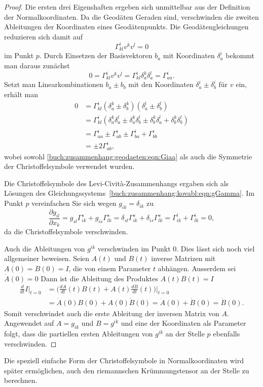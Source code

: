 \begin{proof}
Die ersten drei Eigenshaften ergeben sich unmittelbar aus der Definition
der Normalkoordinaten.
Da die Geodäten Geraden sind, verschwinden die zweiten Ableitungen
der Koordinaten eines Geodätenpunkts.
Die Geodätengleichungen reduzieren sich damit auf
\[
\Gamma^i_{kl} v^kv^l = 0
\]
im Punkt $p$.
Durch Einsetzen der Basisvektoren $b_a$ mit Koordinaten $\delta_a^i$
bekommt man daraus zunächst
\begin{equation}
0
=
\Gamma^i_{kl}v^kv^l
=
\Gamma^i_{kl}\delta_a^k\delta_a^l
=
\Gamma^i_{aa}.
\label{buch:zusammenhang:geodaeten:eqn:Giaa}
\end{equation}
Setzt man Linearkombinationen $b_a\pm b_b$ mit den Koordinaten
$\delta_a^i\pm \delta_b^i$ für $v$ ein, erhält man
\begin{align*}
0
&=
\Gamma^i_{kl} (\delta_a^k \pm \delta_b^k)(\delta_a^l \pm \delta_b^l)
\\
&=
\Gamma^i_{kl}(
    \delta_a^k\delta_a^l
\pm \delta_a^k\delta_b^l
\pm \delta_b^k\delta_a^l
  + \delta_b^k\delta_b^l
)
\\
&=
\Gamma^i_{aa}
\pm
\Gamma^i_{ab}
\pm
\Gamma^i_{ba}
+
\Gamma^i_{bb}
\\
&=
\pm
2
\Gamma^i_{ab},
\end{align*}
wobei sowohl
\eqref{buch:zusammenhang:geodaeten:eqn:Giaa}
als auch die Symmetrie der Christoffelsymbole verwendet wurden.

Die Christoffelsymbole des Levi-Cività-Zusammenhangs ergaben sich
als Lösungen des Gleichungssystems~\ref{buch:zusammenhang:kovabl:eqn:gGamma}.
Im Punkt $p$ vereinfachen Sie sich wegen $g_{ik}=\delta_{ik}$ zu
\[
\frac{\partial g_{il}}{\partial x_k}
=
g_{sl}\Gamma^s_{ik}
+
g_{is}\Gamma^s_{lk}
=
\delta_{sl}\Gamma^s_{ik}
+
\delta_{is}\Gamma^s_{lk}
=
\Gamma^l_{ik}
+
\Gamma^i_{lk}
=
0,
\]
da die Christoffelsymbole verschwinden.

Auch die Ableitungen von $g^{ik}$ verschwinden im Punkt $0$.
Dies lässt sich noch viel allgemeiner beweisen.
Seien $A(t)$ und $B(t)$ inverse Matrizen mit $A(0)=B(0)=I$, die von einem
Parameter $t$ abhängen.
Ausserdem sei $\dot{A}(0)=0$
Dann ist die Ableitung des Produktes $A(t)B(t)=I$
\begin{align*}
\frac{d}{dt}I\bigg|_{t=0}
&=
\biggl(
\frac{dA}{dt}(t) B(t)
+
A(t)
\frac{dB}{dt}(t)
\biggr)\bigg|_{t=0}
\\
&=
\dot{A}(0)
B(0)
+
A(0)
\dot{B}(0)
=
\dot{A}(0)
+
\dot{B}(0)
=
\dot{B}(0).
\end{align*}
Somit verschwindet auch die erste Ableitung der inversen Matrix von $A$.
Angewendet auf $A=g_{ik}$ und $B=g^{ik}$ und eine der Koordinaten als
Parameter folgt, dass die partiellen ersten Ableitungen von $g^{ik}$
an der Stelle $p$ ebenfalls verschwinden.
\end{proof}

Die speziell einfache Form der Christoffelsymbole in Normalkoordinaten
wird später ermöglichen, auch den riemannschen Krümmungstensor an der
Stelle zu berechnen.



